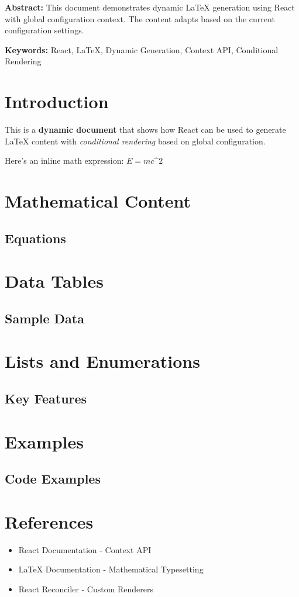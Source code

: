 \documentclass{article}
\begin{document}
\textbf{Abstract:} This document demonstrates dynamic LaTeX generation using React with global configuration context. The content adapts based on the current configuration settings.

\textbf{Keywords:} React, LaTeX, Dynamic Generation, Context API, Conditional Rendering

\section{Introduction}
This is a \textbf{dynamic document} that shows how React can be used to generate LaTeX content with \textit{conditional rendering} based on global configuration.

Here's an inline math expression: $E = mc\^{}2$



\section{Mathematical Content}
\subsection{Equations}



\section{Data Tables}
\subsection{Sample Data}



\section{Lists and Enumerations}
\subsection{Key Features}



\section{Examples}
\subsection{Code Examples}



\section{References}
\begin{itemize}
\item React Documentation - Context API
\item LaTeX Documentation - Mathematical Typesetting
\item React Reconciler - Custom Renderers
\end{itemize}
\end{document}
